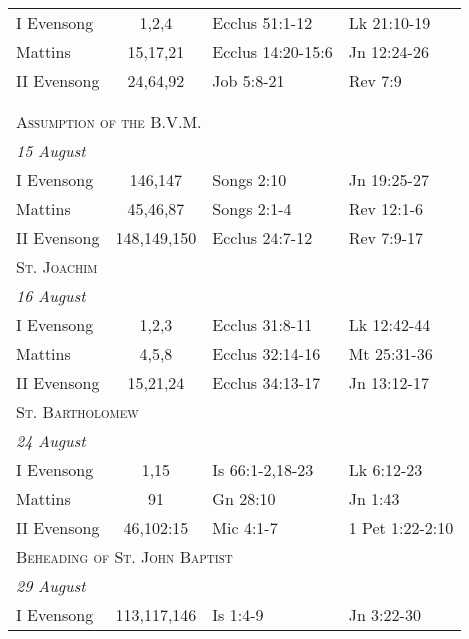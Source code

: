 \begin{longtable}{l c l l}
\hspace{1em} I Evensong&1,2,4&Ecclus 51:1-12&Lk 21:10-19\\
\hspace{1em} Mattins&15,17,21&Ecclus 14:20-15:6&Jn 12:24-26\\
\hspace{1em} II Evensong&24,64,92&Job 5:8-21&Rev 7:9\\
\\
\\
\multicolumn{4}{l}{\textsc{Assumption of the B.V.M.}}\\
\multicolumn{4}{l}{\textit{15 August}}\\
\hspace{1em} I Evensong&146,147&Songs 2:10&Jn 19:25-27\\
\hspace{1em} Mattins&45,46,87&Songs 2:1-4&Rev 12:1-6\\
\hspace{1em} II Evensong&148,149,150&Ecclus 24:7-12&Rev 7:9-17\\
\multicolumn{4}{l}{\textsc{St. Joachim}}\\
\multicolumn{4}{l}{\textit{16 August}}\\
\hspace{1em} I Evensong&1,2,3&Ecclus 31:8-11&Lk 12:42-44\\
\hspace{1em} Mattins&4,5,8&Ecclus 32:14-16&Mt 25:31-36\\
\hspace{1em} II Evensong&15,21,24&Ecclus 34:13-17&Jn 13:12-17\\
\multicolumn{4}{l}{\textsc{St. Bartholomew}}\\
\multicolumn{4}{l}{\textit{24 August}}\\
\hspace{1em} I Evensong&1,15&Is 66:1-2,18-23&Lk 6:12-23\\
\hspace{1em} Mattins&91&Gn 28:10&Jn 1:43\\
\hspace{1em} II Evensong&46,102:15&Mic 4:1-7&1 Pet 1:22-2:10\\
%
\multicolumn{4}{l}{\textsc{Beheading of St. John Baptist}}\\
\multicolumn{4}{l}{\textit{29 August}}\\
\hspace{1em} I Evensong&113,117,146&Is 1:4-9&Jn 3:22-30\\

\end{longtable}
